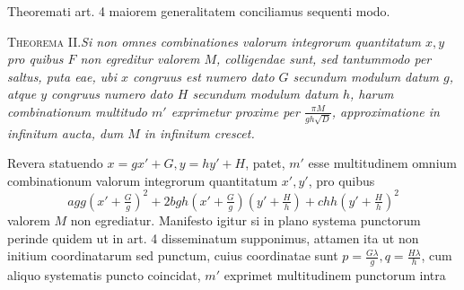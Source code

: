 Theoremati art. 4 maiorem generalitatem conciliamus sequenti modo.

\textsc{Theorema II.}\quad\emph{Si non omnes combinationes valorum integrorum quantitatum $x,y$ pro quibus $F$ non egreditur valorem $M$, colligendae sunt, sed tantummodo per saltus, puta eae, ubi $x$ congruus est numero dato $G$ secundum modulum datum $g$, atque $y$ congruus numero dato $H$ secundum modulum datum $h$, harum combinationum multitudo $m'$ exprimetur proxime per $\frac{\pi M}{gh\surd D}$, approximatione in infinitum aucta, dum $M$ in infinitum crescet.}

Revera statuendo $x=gx'+G,y=hy'+H$, patet, $m'$ esse multitudinem omnium combinationum valorum integrorum quantitatum $x',y'$, pro quibus
\[
agg(x'+\tfrac Gg)^2+2bgh(x'+\tfrac Gg)(y'+\tfrac Hh)+chh(y'+\tfrac Hh)^2
\]
valorem $M$ non egrediatur. Manifesto igitur si in plano systema punctorum perinde quidem ut in art. 4 disseminatum supponimus, attamen ita ut non initium coordinatarum sed punctum, cuius coordinatae sunt $p=\frac{G\lambda}g,q=\frac{H\lambda}h$, cum aliquo systematis puncto coincidat, $m'$ exprimet multitudinem punctorum intra 
